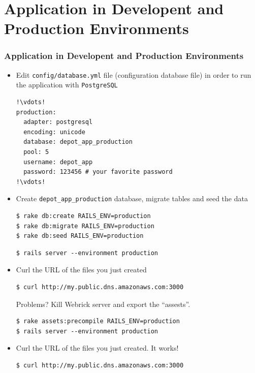 \documentclass{beamer}
\begin{document}
\section{Application in Developent and Production Environments}
\begin{frame}
\frametitle{Application in Developent and Production Environments}
\begin{itemize}
\item Edit \texttt{config/database.yml} file (configuration database file) in order to run the application with \texttt{PostgreSQL}

\lstset{language=Ruby, style=eclipse, numbers=left}
\begin{lstlisting}[escapechar=!]
!\vdots!
production:
  adapter: postgresql
  encoding: unicode
  database: depot_app_production
  pool: 5
  username: depot_app
  password: 123456 # your favorite password
!\vdots!
\end{lstlisting}

\item Create \texttt{depot\_app\_production} database, migrate tables and  seed the data

\lstset{language=shell, style=eclipse}
\begin{lstlisting}[numbers=none, escapechar=!]
$ rake db:create RAILS_ENV=production
$ rake db:migrate RAILS_ENV=production
$ rake db:seed RAILS_ENV=production
\end{lstlisting}

\lstset{language=shell}
\begin{lstlisting}[escapechar=!]
$ rails server --environment production
\end{lstlisting}

\item Curl the URL of the files you just created

\lstset{language=shell}
\begin{lstlisting}[escapechar=!]
$ curl http://my.public.dns.amazonaws.com:3000
\end{lstlisting}

Problems? Kill Webrick server and export the ``assests''. 

\lstset{language=shell}
\begin{lstlisting}[escapechar=!]
$ rake assets:precompile RAILS_ENV=production
$ rails server --environment production
\end{lstlisting}

\item Curl the URL of the files you just created. It works!
\lstset{language=shell}
\begin{lstlisting}[escapechar=!]
$ curl http://my.public.dns.amazonaws.com:3000
\end{lstlisting}
\end{itemize}

\end{frame}
\end{document}
